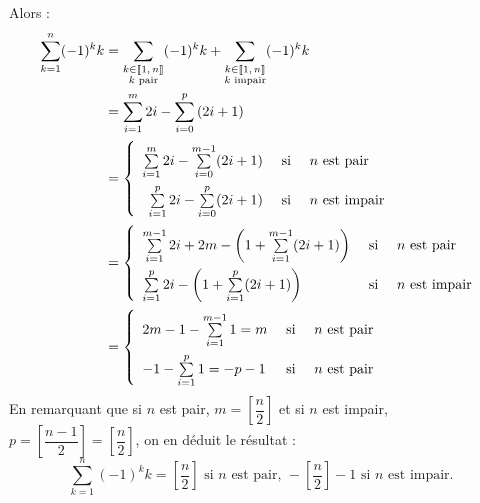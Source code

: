 {{	Alors : 
	\begin{align*}
		\sum_{k=1}^n (-1)^k k &= \sum_{\substack{k\in \llbracket 1,\,n\rrbracket\\k \text{ pair}}} (-1)^k k + \sum_{\substack{k\in \llbracket 1,\,n\rrbracket\\k \text{ impair}}} (-1)^k k \\
		&= \sum_{i=1}^{m} 2i - \sum_{i=0}^{p} \left(2i+1\right)\\
		&= \left \{ {\def\arraystretch{2.2}\begin{array}{rcl} \sum\limits_{i=1}^m 2i - \sum\limits_{i=0}^{m-1} (2i+1)& \text{ si }& n\text{ est pair}\\\sum\limits_{i=1}^p 2i - \sum\limits_{i=0}^{p} (2i+1)& \text{ si }& n\text{ est impair}\end{array} } \right.\\
		&= \left \{ {\def\arraystretch{2.2}\begin{array}{lcl} \sum\limits_{i=1}^{m-1} 2i + 2m - \left(1 + \sum\limits_{i=1}^{m-1} (2i+1)\right)& \text{ si }& n\text{ est pair}\\\sum\limits_{i=1}^p 2i - \left(1+\sum\limits_{i=1}^{p} (2i+1)\right)& \text{ si }& n\text{ est impair}\end{array} } \right.\\
		&= \left \{  \begin{array}{lcl} 2m- 1-\sum\limits_{i=1}^{m-1} 1 = m &\text{ si }& n\text{ est pair} \\ -1-\sum\limits_{i=1}^p 1 = -p-1 &\text{ si }& n\text{ est pair}\end{array}\right.
	\end{align*}
	En remarquant que si $n$ est pair, $m=\left [ \dfrac{n}{2}\right]$ et si $n$ est impair, $p=\left[ \dfrac{n-1}{2}\right]=\left[ \dfrac{n}{2} \right]$, on en déduit le résultat :
	\[ \boxed{\sum_{k=1}^n (-1)^k k = \left[\frac{n}{2}\right] \text{ si $n$ est pair, } -\left[\frac{n}{2}\right]-1 \text{ si $n$ est impair.}}\]}
}

